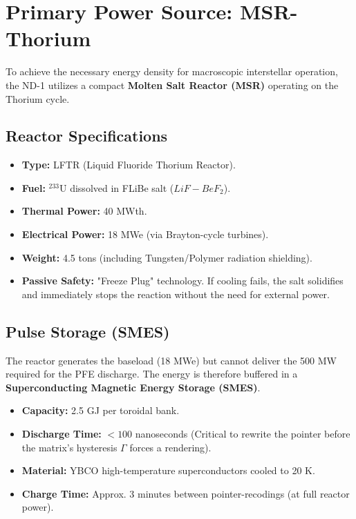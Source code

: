 \documentclass[12pt,a4paper]{article}
\begin{document}
\section{Primary Power Source: MSR-Thorium}
To achieve the necessary energy density for macroscopic interstellar operation, the ND-1 utilizes a compact \textbf{Molten Salt Reactor (MSR)} operating on the Thorium cycle.




\subsection{Reactor Specifications}
\begin{itemize}
    \item \textbf{Type:} LFTR (Liquid Fluoride Thorium Reactor).
    \item \textbf{Fuel:} $^{233}$U dissolved in FLiBe salt ($LiF-BeF_2$).
    \item \textbf{Thermal Power:} 40 MWth.
    \item \textbf{Electrical Power:} 18 MWe (via Brayton-cycle turbines).
    \item \textbf{Weight:} 4.5 tons (including Tungsten/Polymer radiation shielding).
    \item \textbf{Passive Safety:} "Freeze Plug" technology. If cooling fails, the salt solidifies and immediately stops the reaction without the need for external power.
\end{itemize}

\subsection{Pulse Storage (SMES)}
The reactor generates the baseload (18 MWe) but cannot deliver the 500 MW required for the PFE discharge. The energy is therefore buffered in a \textbf{Superconducting Magnetic Energy Storage (SMES)}.

\begin{itemize}
    \item \textbf{Capacity:} 2.5 GJ per toroidal bank.
    \item \textbf{Discharge Time:} $< 100$ nanoseconds (Critical to rewrite the pointer before the matrix's hysteresis $\Gamma$ forces a rendering).
    \item \textbf{Material:} YBCO high-temperature superconductors cooled to 20 K.
    \item \textbf{Charge Time:} Approx. 3 minutes between pointer-recodings (at full reactor power).
\end{itemize}
\end{document}
